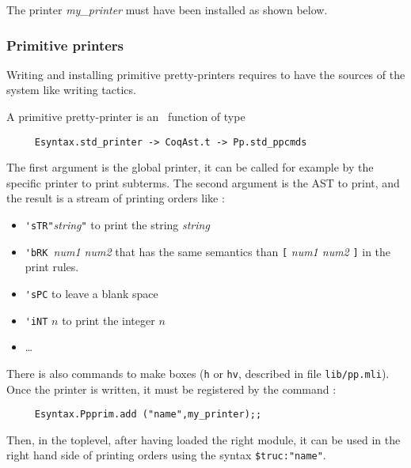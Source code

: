 
The printer \textit{my\_printer} must have been installed as shown
below.

\subsubsection{Primitive printers}

Writing and installing primitive pretty-printers requires to have the
sources of the system like writing tactics.

A primitive pretty-printer is an \ocaml\ function of type
\begin{verbatim}
     Esyntax.std_printer -> CoqAst.t -> Pp.std_ppcmds
\end{verbatim}
The first
argument is the global printer, it can be called for example by the
specific printer to print subterms. The second argument is the AST to
print, and the result is a stream of printing orders like :

\begin{itemize}
\item \verb+'sTR"+\textit{string}\verb+"+ to print the string
  \textit{string}
\item \verb+'bRK +\textit{num1 num2} that has the same semantics than
  \verb+[+ \textit{num1 num2} \verb+]+ in the print rules.
\item \verb+'sPC+ to leave a blank space
\item \verb+'iNT+ $n$ to print the integer $n$ 
\item \ldots
\end{itemize}

There is also commands to make boxes (\verb+h+ or \verb+hv+, described
in file {\tt lib/pp.mli}). Once the printer is written, it
must be registered by the command :
\begin{verbatim}
     Esyntax.Ppprim.add ("name",my_printer);;
\end{verbatim}
\noindent 
Then, in the toplevel, after having loaded the right {\ocaml} module,
it can be used in the right hand side of printing orders using the
syntax \verb+$truc:"name"+.

